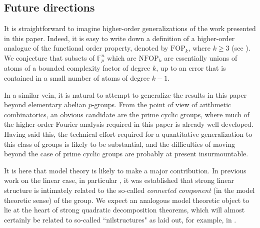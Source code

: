 \documentclass[12pt,oneside,british,a4wide]{amsart}
\numberwithin{equation}{section}
\theoremstyle{definition}
\def\F{\mathbb{F}}
\def\FOP{\mathrm{FOP}}
\def\NFOP{\mathrm{NFOP}}
\begin{document}
\subsection{Future directions}\label{subsec:future}
It is straightforward to imagine higher-order generalizations of the work presented in this paper. Indeed, it is easy to write down a definition of a higher-order analogue of the functional order property, denoted by $\FOP_k$, where $k\geq 3$ (see \cite[Definition 2.61]{Terry.2021b}). We conjecture that subsets of $\F_p^n$ which are $\NFOP_k$ are essentially unions of atoms of a bounded complexity factor of degree $k$, up to an error that is contained in a small number of atoms of degree $k-1$. 

In a similar vein, it is natural to attempt to generalize the results in this paper beyond elementary abelian $p$-groups. From the point of view of arithmetic combinatorics, an obvious candidate are the prime cyclic groups, where much of the higher-order Fourier analysis required in this paper is already well developed. Having said this, the technical effort required for a quantitative generalization to this class of groups is likely to be substantial, and the difficulties of moving beyond the case of prime cyclic groups are probably at present insurmountable. 

It is here that model theory is likely to make a major contribution. In previous work on the linear case, in particular \cite{Conant.2017p4,Conant.2018zd}, it was established that strong linear structure is intimately related to the so-called \emph{connected component} (in the model theoretic sense) of the group. We expect an analogous model theoretic object to lie at the heart of strong quadratic decomposition theorems, which will almost certainly be related to so-called ``nilstructures" as laid out, for example, in \cite{Green.2012xge, Candela.2019}.

\medskip
\end{document}
